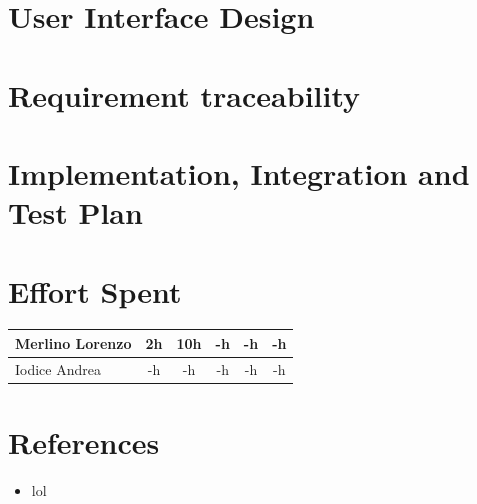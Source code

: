\documentclass{article}
\begin{document}
\newpage
\section{User Interface Design}


\newpage
\section{Requirement traceability}


\newpage
\section{Implementation, Integration and Test Plan}

\newpage
\section{Effort Spent}
\begin{center}
\begin{tabular}{||l|c|c|c|c|c||}
\hline
Merlino Lorenzo & 2h & 10h & -h & -h & -h
\\
\hline
Iodice Andrea & -h & -h & -h & -h & -h
\\
\hline
\end{tabular}
\end{center}

\newpage
\section{References}
\begin{itemize}
\item lol
\end{itemize}
\end{document}
